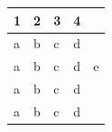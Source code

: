 \documentclass[11pt,a4paper]{article}
\begin{document}
\begin{table}[h]
\begin{tabular}{|l|l|l|l|l|}
\hline
1 & 2 & 3 & 4 &  \\ \hline
a & b & c & d &  \\ \hline
a & b & c & d & e \\ \hline
a & b & c & d &  \\ \hline
a & b & c & d &  \\ \hline
\end{tabular}
\end{table}
\end{document}
